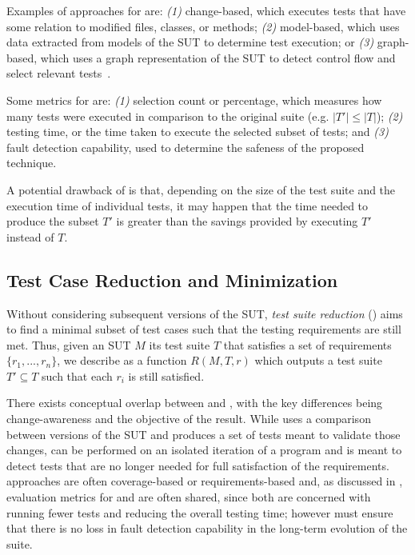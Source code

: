 Examples of approaches for \tcs are: \textit{(1)} change-based, which executes tests that have some relation to modified files, classes, or methods; \textit{(2)} model-based, which uses data extracted from models of the SUT to determine test execution; or \textit{(3)} graph-based, which uses a graph representation of the SUT to detect control flow and select relevant tests~\cite{kazmi_effective_2017}.

Some metrics for \tcs are: \textit{(1)} selection count or percentage, which measures how many tests were executed in comparison to the original suite (e.g. $|T'| \leq |T|$); \textit{(2)} testing time, or the time taken to execute the selected subset of tests; and \textit{(3)} fault detection capability, used to determine the safeness of the proposed technique.

A potential drawback of \tcs is that, depending on the size of the test suite and the execution time of individual tests, it may happen that the time needed to produce the subset $T'$ is greater than the savings provided by executing $T'$ instead of $T$. 

\subsection{Test Case Reduction and Minimization}
\label{sec:tsr}

Without considering subsequent versions of the SUT, \textit{test suite reduction} (\tsr) aims to find a minimal subset of test cases such that the testing requirements are still met.
Thus, given an SUT $M$ its test suite $T$ that satisfies a set of requirements $\{r_1, ..., r_n\}$, we describe \tsr as a function $R(M, T, r)$ which outputs a test suite $T' \subseteq T$ such that each $r_i$ is still satisfied.

There exists conceptual overlap between \tcs and \tsr, with the key differences being change-awareness and the objective of the result.
While \tcs uses a comparison between versions of the SUT and produces a set of tests meant to validate those changes, \tsr can be performed on an isolated iteration of a program and is meant to detect tests that are no longer needed for full satisfaction of the requirements.
\tsr approaches are often coverage-based or requirements-based and, as discussed in , evaluation metrics for \tcp and \tsr are often shared, since both are concerned with running fewer tests and reducing the overall testing time; however \tsr must ensure that there is no loss in fault detection capability in the long-term evolution of the suite.

